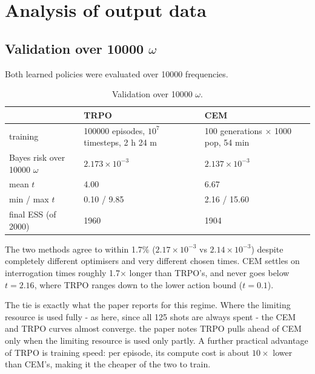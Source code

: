 \documentclass[12pt,a4paper]{article}
\begin{document}
\section{Analysis of output data}
\label{sec:analysis-of-output-data}

\subsection{Validation over \num{10000} $\omega$}
\label{sec:validation-over-10000-omega}
Both learned policies were evaluated over \num{10000} frequencies.

\begin{table}[H]
  \centering
  \caption{Validation over \num{10000} $\omega$.}
  \label{tab:validation-over-10000-omega}
  \scriptsize
  \begin{tabular}{lll}
  \toprule
   & TRPO & CEM \\
  \midrule
  training & \num{100000} episodes, $10^7$ timesteps, 2 h 24 m & 100 generations $\times$ 1000 pop,
  54 min \\
  Bayes risk over \num{10000} $\omega$ & $2.173\times 10^{-3}$ & $2.137\times 10^{-3}$ \\
  mean $t$ & 4.00 & 6.67 \\
  min / max $t$ & 0.10 / 9.85 & 2.16 / 15.60 \\
  final ESS (of 2000) & 1960 & 1904 \\
  \bottomrule
  \end{tabular}
\end{table}
The two methods agree to within 1.7\% ($2.17\times 10^{-3}$ vs $2.14\times 10^{-3}$) despite
completely different optimisers and very different chosen times. CEM settles on
interrogation times roughly 1.7$\times$ longer than TRPO's, and never goes below $t = 2.16$, where
TRPO ranges down to the lower action bound ($t = 0.1$).

The tie is exactly what the paper reports for this regime. Where the limiting resource is used
fully - as here, since all 125 shots are always spent - the CEM and TRPO curves almost converge.
the paper notes TRPO pulls ahead of CEM only when the limiting resource is used only partly.
A further practical advantage of TRPO is training speed: per episode, its compute cost is about
$10\times$ lower than CEM's, making it the cheaper of the two to train.
\end{document}
